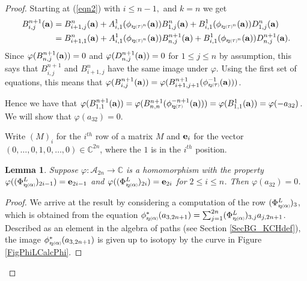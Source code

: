 \documentclass[11pt]{amsart}
\newcommand*{\subsmallp}[1]{\scalebox{.5}{\ensuremath#1}}
\newcommand{\subpp}[2][p]{\imath_{\hspace*{-1pt}#1}\hspace*{-.5pt}\subsmallp(#2\subsmallp)}
\newcommand{\al}[1]{\begin{align*}#1\end{align*}}
\newtheorem{lem}[thm]{Lemma}
\theoremstyle{definition}
\begin{document}
\begin{proof}
Starting at (\ref{eqn2}) with $i\le n-1,$ and $k=n$ we get
  \al{
    B_{i,j}^{n+1}({\bf a})  
      &= B_{i+1,j}^n({\bf a}) + A_{i,1}^1(\phi_{\subpp[2]\tau^n}({\bf a}))B_{1,j}^n({\bf a})+B_{i,1}^1(\phi_{\subpp[2]\tau^n}({\bf a}))D_{1,j}^n({\bf a}) \\
      &= B_{i+1,1}^n({\bf a}) + A_{i,1}^1(\phi_{\subpp[2]\tau^n}({\bf a}))B_{n,j}^{n+1}({\bf a})+B_{i,1}^1(\phi_{\subpp[2]\tau^n}({\bf a}))D_{n,j}^{n+1}({\bf a}).
  }
  Since $\varphi(B_{n,j}^{n+1}({\bf a}))=0$ and $\varphi(D_{n,j}^{n+1}({\bf a}))=0$ for $1\le j\le n$ by assumption, this says that $B_{i,j}^{n+1}$ and $B_{i+1,j}^n$ have the same image under $\varphi$. Using the first set of equations, this means that $\varphi(B_{i,j}^{n+1}({\bf a}))=\varphi(B_{i+1,j+1}^{n+1}(\phi_{\subpp[2]\tau}^{-1}({\bf a})))$.

  Hence we have that $\varphi(B_{1,1}^{n+1}({\bf a})) = \varphi(B_{n,n}^{n+1}(\phi_{\subpp[2]\tau}^{-n+1}({\bf a}))) = \varphi(B_{1,1}^1({\bf a})) = \varphi(-a_{32})$. We will show that $\varphi(a_{32}) = 0$.

Write $(M)_i$ for the $i^{th}$ row of a matrix $M$ and ${\bf e}_i$ for the vector $(0,\ldots,0,1,0,\ldots,0)\in\mathbb C^{2n}$, where the $1$ is in the $i^{th}$ position.

\begin{lem}Suppose $\varphi:\mathcal A_{2n}\to \mathbb C$ is a homomorphism with the property $\varphi((\Phi_{\subpp[2]\alpha}^L)_{2i-1})={\bf e}_{2i-1}$ and $\varphi((\Phi_{\subpp[2]\alpha}^L)_{2i})={\bf e}_{2i}$ for $2\le i\le n$. Then $\varphi(a_{32}) = 0$.
\label{LemZeroness}
\end{lem}
\begin{proof}We arrive at the result by considering a computation of the row $(\Phi_{\subpp[2]\alpha}^L)_3$, which is obtained from the equation $\phi_{\subpp[2]\alpha}^{\ast}(a_{3,2n+1}) = \sum_{j=1}^{2n}(\Phi_{\subpp[2]\alpha}^L)_{3,j}a_{j,2n+1}$. Described as an element in the algebra of paths (see Section \ref{SecBG_KCHdef}), the image $\phi_{\subpp[2]\alpha}^{\ast}(a_{3,2n+1})$ is given up to isotopy by the curve in Figure \ref{FigPhiLCalcPhi}.


\end{proof}
\end{proof}
\end{document}
